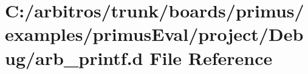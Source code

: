 \hypertarget{boards_2primus_2examples_2primus_eval_2project_2_debug_2arb__printf_8d}{\section{C\-:/arbitros/trunk/boards/primus/examples/primus\-Eval/project/\-Debug/arb\-\_\-printf.d File Reference}
\label{boards_2primus_2examples_2primus_eval_2project_2_debug_2arb__printf_8d}
}
